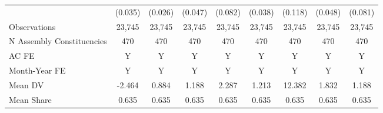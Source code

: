 {\begin{tabular}{l*{8}{c}}
            &     (0.035)         &     (0.026)         &     (0.047)         &     (0.082)         &     (0.038)         &     (0.118)         &     (0.048)         &     (0.081)         \\
Observations&      23,745         &      23,745         &      23,745         &      23,745         &      23,745         &      23,745         &      23,745         &      23,745         \\
N Assembly Constituencies&         470         &         470         &         470         &         470         &         470         &         470         &         470         &         470         \\
AC FE       &           Y         &           Y         &           Y         &           Y         &           Y         &           Y         &           Y         &           Y         \\
Month-Year FE&           Y         &           Y         &           Y         &           Y         &           Y         &           Y         &           Y         &           Y         \\
Mean DV     &      -2.464         &       0.884         &       1.188         &       2.287         &       1.213         &      12.382         &       1.832         &       1.188         \\
Mean Share  &       0.635         &       0.635         &       0.635         &       0.635         &       0.635         &       0.635         &       0.635         &       0.635         \\
\bottomrule
\end{tabular}
}
